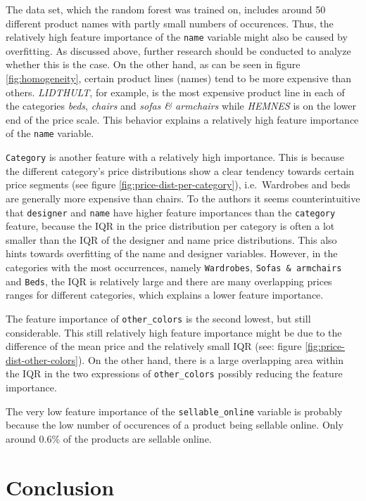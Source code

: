 \documentclass[a4paper, nobind]{templates/ociamthesis}
\begin{document}
The data set, which the random forest was trained on, includes around 50 different product names with partly small numbers of occurences. Thus, the relatively high feature importance of the \texttt{name} variable might also be caused by overfitting. As discussed above, further research should be conducted to analyze whether this is the case. On the other hand, as can be seen in figure \ref{fig:homogeneity}, certain product lines (names) tend to be more expensive than others. \emph{LIDTHULT}, for example, is the most expensive product line in each of the categories \emph{beds}, \emph{chairs} and \emph{sofas \& armchairs} while \emph{HEMNES} is on the lower end of the price scale. This behavior explains a relatively high feature importance of the \texttt{name} variable.

\texttt{Category} is another feature with a relatively high importance. This is because the different category's price distributions show a clear tendency towards certain price segments (see figure \ref{fig:price-dist-per-category}), i.e.~Wardrobes and beds are generally more expensive than chairs.
To the authors it seems counterintuitive that \texttt{designer} and \texttt{name} have higher feature importances than the \texttt{category} feature, because the IQR in the price distribution per category is often a lot smaller than the IQR of the designer and name price distributions. This also hints towards overfitting of the name and designer variables. However, in the categories with the most occurrences, namely \texttt{Wardrobes}, \texttt{Sofas\ \&\ armchairs} and \texttt{Beds}, the IQR is relatively large and there are many overlapping prices ranges for different categories, which explains a lower feature importance.

The feature importance of \texttt{other\_colors} is the second lowest, but still considerable. This still relatively high feature importance might be due to the difference of the mean price and the relatively small IQR (see: figure \ref{fig:price-dist-other-colors}). On the other hand, there is a large overlapping area within the IQR in the two expressions of \texttt{other\_colors} possibly reducing the feature importance.

The very low feature importance of the \texttt{sellable\_online} variable is probably because the low number of occurences of a product being sellable online. Only around 0.6\% of the products are sellable online.

\hypertarget{conclusion}{%
\section{Conclusion}\label{conclusion}}
\end{document}
